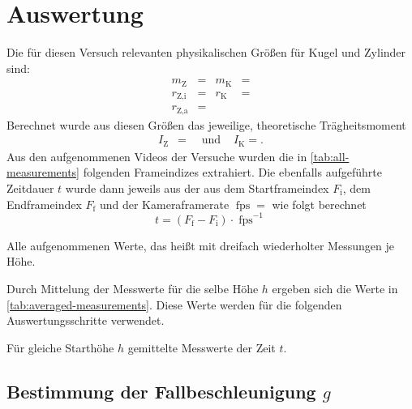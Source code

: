 \section{Auswertung}
\label{sec:Auswertung}
Die für diesen Versuch relevanten physikalischen Größen für Kugel und Zylinder sind:
\begin{align}
  \label{eq:physical-properties}
  m_\text{Z} &=  & m_\text{K} &= \nonumber\\
  r_{\text{Z},\text{i}} &=  & r_\text{K} &= \\
  r_{\text{Z},\text{a}} &=  &&\nonumber
\end{align}
Berechnet wurde aus diesen Größen das jeweilige, theoretische Trägheitsmoment
\begin{align}
  \label{eq:moments-inertia}
  I_\text{Z} &= \quad\text{ und } & I_\text{K} = .
\end{align}
Aus den aufgenommenen Videos der Versuche wurden die in \autoref{tab:all-measurements} folgenden Frameindizes extrahiert.
Die ebenfalls aufgeführte Zeitdauer $t$ wurde dann jeweils aus der aus dem Startframeindex $F_\text{i}$,
dem Endframeindex $F_\text{f}$ und der Kameraframerate $\operatorname{fps}=$ wie folgt 
berechnet
\begin{equation*}
  t = (F_\text{f} - F_\text{i})\cdot\operatorname{fps}^{-1}
\end{equation*}

\begin{table}
  \centering
  \caption{Alle aufgenommenen Werte, das heißt mit dreifach wiederholter Messungen je Höhe.}
  \label{tab:all-measurements}
  
\end{table}

Durch Mittelung der Messwerte für die selbe Höhe $h$ ergeben sich die Werte
in \autoref{tab:averaged-measurements}. Diese Werte werden für die folgenden
Auswertungsschritte verwendet.

\begin{table}
  \centering
  \caption{Für gleiche Starthöhe $h$ gemittelte Messwerte der Zeit $t$.}
  \label{tab:averaged-measurements}
  
\end{table}

\subsection{Bestimmung der Fallbeschleunigung $g$}

